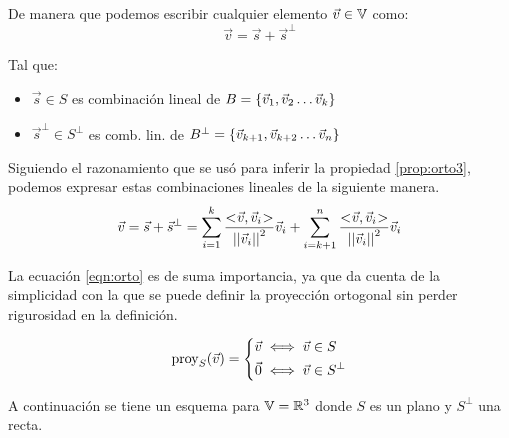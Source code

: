 De manera que podemos escribir cualquier elemento $\Vec{v}\in\mathbb{V}$ como:
\begin{equation*}
    \Vec{v} = \Vec{s} + \Vec{s}^\perp
\end{equation*}

Tal que:
\begin{itemize}
    \item 
    $\Vec{s} \in S$ es combinación lineal de $B={ \left\{ {\Vec{v}_1 , \Vec{v}_2 \dots \Vec{v}_k} \right\} }$
    
    \item
    $\Vec{s}^\perp \in S^\perp$ es comb. lin. de $B^\perp = { \left\{ {\Vec{v}_{k+1} , \Vec{v}_{k+2} \dots \Vec{v}_n} \right\} }$
\end{itemize}

Siguiendo el razonamiento que se usó para inferir la propiedad \ref{prop:orto3}, podemos expresar estas combinaciones lineales de la siguiente manera.
\begin{equation}
    \Vec{v} = \Vec{s} + \Vec{s}^\perp =
    \sum_{i=1}^k \frac{<\hspace{-0.8mm}\Vec{v},\Vec{v}_i\hspace{-0.8mm}>}{{\left|\left| {\Vec{v}_i} \right|\right|}^2} \Vec{v}_i +
    \sum_{i=k+1}^n \frac{<\hspace{-0.8mm}\Vec{v},\Vec{v}_i\hspace{-0.8mm}>}{{\left|\left| {\Vec{v}_i} \right|\right|}^2} \Vec{v}_i
    \label{eqn:orto}
\end{equation}

La ecuación \ref{eqn:orto} es de suma importancia, ya que da cuenta de la simplicidad con la que se puede definir la proyección ortogonal sin perder rigurosidad en la definición.

\begin{mdframed}[style=DefinitionFrame]
    \begin{defn}
        \label{defn:proyOrto}
    \end{defn}
    \begin{equation*}
        \operatorname{proy}_S(\Vec{v}) =
        \left\{
        \begin{aligned}
            \Vec{v} & \iff \Vec{v} \in S
            \\
            \Vec{0} & \iff \Vec{v} \in S^\perp
        \end{aligned}
        \right.
    \end{equation*}
\end{mdframed}

A continuación se tiene un esquema para $\mathbb{V}=\mathbb{R}^3$ donde $S$ es un plano y $S^\perp$ una recta.

